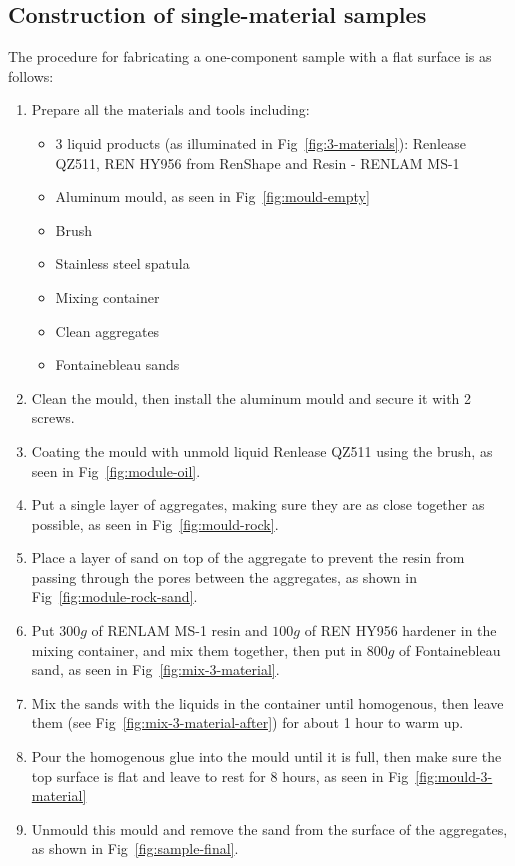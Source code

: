 \subsection{Construction of single-material samples}

The procedure for fabricating a one-component sample with a flat surface is as follows:
\begin{enumerate}
    \item Prepare all the materials and tools including:
    \begin{itemize}
        \item 3 liquid products (as illuminated in Fig~\ref{fig:3-materials}): Renlease QZ511, REN HY956 from RenShape and Resin - RENLAM MS-1
        \item Aluminum mould, as seen in Fig~\ref{fig:mould-empty}
        \item Brush
        \item Stainless steel spatula
        \item Mixing container
        \item Clean aggregates
        \item Fontainebleau sands
    \end{itemize}

    \item Clean the mould, then install the aluminum mould and secure it with 2 screws.
    \item Coating the mould with unmold liquid Renlease QZ511 using the brush, as seen in Fig~\ref{fig:module-oil}.
    \item Put a single layer of aggregates, making sure they are as close together as possible, as seen in Fig~\ref{fig:mould-rock}.
    \item Place a layer of sand on top of the aggregate to prevent the resin from passing through the pores between the aggregates, as shown in Fig~\ref{fig:module-rock-sand}.
    \item Put $300g$ of RENLAM MS-1 resin and $100g$ of REN HY956 hardener in the mixing container, and mix them together, then put in $800g$ of Fontainebleau sand, as seen in Fig~\ref{fig:mix-3-material}.
    \item Mix the sands with the liquids in the container until homogenous, then leave them (see Fig~\ref{fig:mix-3-material-after}) for about 1 hour to warm up.
    \item Pour the homogenous glue into the mould until it is full, then make sure the top surface is flat and leave to rest for 8 hours, as seen in Fig~\ref{fig:mould-3-material}
    \item Unmould this mould and remove the sand from the surface of the aggregates, as shown in Fig~\ref{fig:sample-final}.
\end{enumerate}



